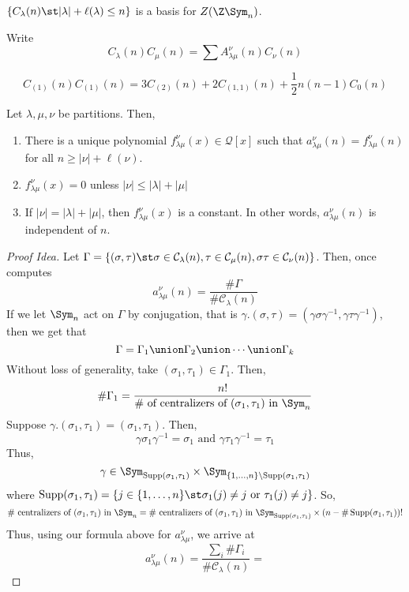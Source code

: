 \documentclass[11pt,leqno,oneside]{amsbook}
\renewcommand{\Q}{\mathcal{Q}}
\newcommand{\CC}{\mathcal{C}} %
\DeclareMathOperator{\Supp}{Supp}
\numberwithin{thm}{section}
\begin{document}
\begin{prop}
  \(\{C_\lambda(n) \st |\lambda|+\ell(\lambda) \leq n\}\) is a basis
  for \(Z(\Z \Sym_n)\). 
\end{prop}
\begin{defn}
  Write \[
    C_\lambda(n) C_\mu(n) = \sum A_{\lambda \mu}^\nu(n) C_\nu(n)
  \]
\end{defn}
\begin{example}
  \[
    C_{(1)}(n) C_{(1)}(n) = 3 C_{(2)}(n) + 2 C_{(1,1)}(n) +
    \frac{1}{2}n(n-1) C_0(n)
  \]
\end{example}
\begin{thm}
  Let \(\lambda,\mu,\nu\) be partitions. Then,
  \begin{enumerate}
  \item There is a unique polynomial \(f_{\lambda \mu}^\nu(x) \in
    \Q[x]\) such that \(a_{\lambda \mu}^\nu(n) = f_{\lambda
      \mu}^\nu(n)\) for all \(n \geq |\nu|+\ell(\nu)\).
  \item \(f_{\lambda \mu}^\nu(x) = 0\) unless \(|\nu| \leq
    |\lambda|+|\mu|\)
  \item If \(|\nu| = |\lambda|+|\mu|\), then \(f_{\lambda
      \mu}^\nu(x)\) is a constant. In other words, \(a_{\lambda
      \mu}^\nu(n)\) is independent of \(n\).
  \end{enumerate}
\end{thm}
\begin{proof}[Proof Idea]
  Let \(\Gamma = \{(\sigma,\tau) \st \sigma \in \CC_\lambda(n), \tau
  \in \CC_\mu(n), \sigma \tau \in \CC_\nu(n)\}\). Then, once
  computes \[
    a_{\lambda \mu}^\nu(n) = \frac{\# \Gamma}{\# \CC_\lambda(n)}
  \]
  If we let \(\Sym_n\) act on \(\Gamma\) by conjugation, that is
  \(\gamma.(\sigma,\tau) = (\gamma \sigma \gamma^{-1}, \gamma \tau
  \gamma^{-1})\), then we get that \[
    \Gamma = \Gamma_1 \union \Gamma_2 \union \cdots \union \Gamma_k
  \]
  Without loss of generality, take \((\sigma_1, \tau_1) \in
  \Gamma_1\). Then, \[
    \# \Gamma_1 = \frac{n!}{\#\text{ of centralizers of
      }(\sigma_1,\tau_1)\text{ in }\Sym_n}
  \]
  Suppose \(\gamma.(\sigma_1,\tau_1) = (\sigma_1,\tau_1)\). Then, \[
    \gamma \sigma_1 \gamma^{-1} = \sigma_1 \text{ and } \gamma \tau_1
    \gamma^{-1} = \tau_1
  \]
  Thus, \[
    \gamma \in \Sym_{\Supp(\sigma_1,\tau_1)} \times
    \Sym_{\{1,\ldots,n\} \setminus \Supp(\sigma_1, \tau_1)}
  \]
  where \(\Supp(\sigma_1,\tau_1) = \{j \in \{1,\ldots,n\} \st
  \sigma_1(j) \neq j \text{ or }\tau_1(j) \neq j\}\). So, \[
    \# \text{ centralizers of }(\sigma_1, \tau_1)\text{ in }\Sym_n =
    \# \text{ centralizers of }(\sigma_1, \tau_1)\text{ in
    }\Sym_{\Supp(\sigma_1,\tau_1)} \times (n - \# \Supp(\sigma_1,\tau_1))!
  \]
  Thus, using our formula above for \(a_{\lambda \mu}^\nu\), we arrive
  at \[
    a_{\lambda \mu}^\nu(n) = \frac{\sum_i \# \Gamma_i}{\#
      \CC_\lambda(n)} = 
  \]
\end{proof}
\end{document}
